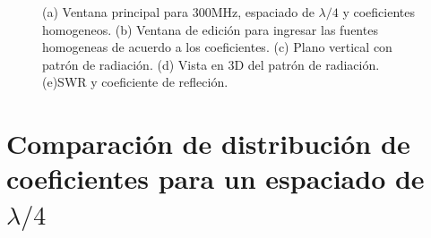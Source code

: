 \documentclass[11pt]{book}
\begin{document}
\begin{figure}[h]
	\caption{(a) Ventana principal para 300MHz, espaciado de $\lambda / 4$ y coeficientes homogeneos. (b) Ventana de edición para ingresar las fuentes homogeneas de acuerdo a los coeficientes. (c) Plano vertical con patrón de radiación. (d) Vista en 3D del patrón de radiación. (e)SWR y coeficiente de refleción.}
\end{figure}

\newpage


\section{Comparación de distribución de coeficientes para un espaciado de $\lambda/4$}
\end{document}
